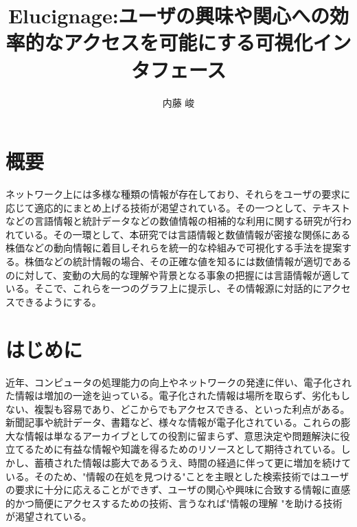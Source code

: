\documentclass{matsushita-zemi}
\title{Elucignage:ユーザの興味や関心への効率的なアクセスを可能にする可視化インタフェース}
\author{内藤 峻}
\begin{document}
\maketitle

\section*{概要}
\label{abstract}
ネットワーク上には多様な種類の情報が存在しており、それらをユーザの要求に応じて適応的にまとめ上げる技術が渇望されている。その一つとして、テキストなどの言語情報と統計データなどの数値情報の相補的な利用に関する研究が行われている。その一環として、本研究では言語情報と数値情報が密接な関係にある株価などの動向情報に着目しそれらを統一的な枠組みで可視化する手法を提案する。株価などの統計情報の場合、その正確な値を知るには数値情報が適切であるのに対して、変動の大局的な理解や背景となる事象の把握には言語情報が適している。そこで、これらを一つのグラフ上に提示し、その情報源に対話的にアクセスできるようにする。

\section{はじめに}
\label{background}

近年、コンピュータの処理能力の向上やネットワークの発達に伴い、電子化された情報は増加の一途を辿っている。電子化された情報は場所を取らず、劣化もしない、複製も容易であり、どこからでもアクセスできる、といった利点がある。新聞記事や統計データ、書籍など、様々な情報が電子化されている。これらの膨大な情報は単なるアーカイブとしての役割に留まらず、意思決定や問題解決に役立てるために有益な情報や知識を得るためのリソースとして期待されている。しかし、蓄積された情報は膨大であるうえ、時間の経過に伴って更に増加を続けている。そのため、"情報の在処を見つける"ことを主眼とした検索技術ではユーザの要求に十分に応えることができず、ユーザの関心や興味に合致する情報に直感的かつ簡便にアクセスするための技術、言うなれば"情報の理解   "を助ける技術が渇望されている。

\end{document}
